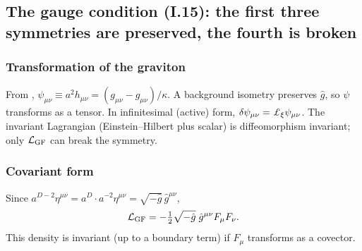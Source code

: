 \subsection{The gauge condition (I.15): the first three symmetries are preserved, the fourth is broken}
\label{ssec:ch7-gauge}

\subsubsection{Transformation of the graviton}
\tD{}
From , $\psi_{\mu\nu}\equiv a^2h_{\mu\nu}=(g_{\mu\nu}-\hat g_{\mu\nu})/\kappa$.
A background isometry preserves $\hat g$, so $\psi$ transforms as a tensor.
In infinitesimal (active) form, $\delta\psi_{\mu\nu}=\chsevLie_\xi\psi_{\mu\nu}$.
The invariant Lagrangian (Einstein--Hilbert plus scalar) is diffeomorphism invariant; only $\mathcal{L}_{\mathrm{GF}}$ can break the symmetry.

\subsubsection{Covariant form}
\tD{}
Since $a^{D-2}\eta^{\mu\nu}=a^D\cdot a^{-2}\eta^{\mu\nu}=\sqrt{-\hat g}\,\hat g^{\mu\nu}$,
\begin{equation}
\mathcal{L}_{\mathrm{GF}}=-\tfrac12\sqrt{-\hat g}\;\hat g^{\mu\nu}F_\mu F_\nu .
\label{eq:ch7-LGF-cov}
\end{equation}
This density is invariant (up to a boundary term) if $F_\mu$ transforms as a covector.

